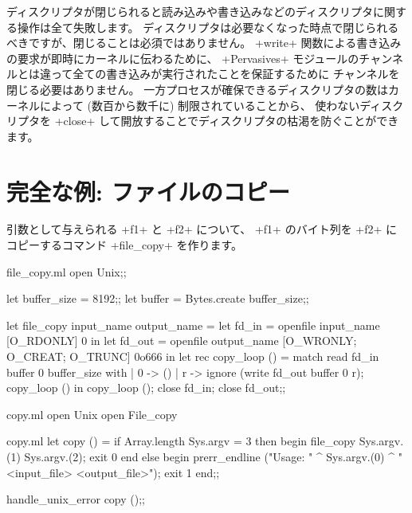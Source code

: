 ディスクリプタが閉じられると読み込みや書き込みなどのディスクリプタに関する操作は全て失敗します。
ディスクリプタは必要なくなった時点で閉じられるべきですが、閉じることは必須ではありません。
\ml+write+ 関数による書き込みの要求が即時にカーネルに伝わるために、
\ml+Pervasives+ モジュールのチャンネルとは違って全ての書き込みが実行されたことを保証するために
チャンネルを閉じる必要はありません。
一方プロセスが確保できるディスクリプタの数はカーネルによって (数百から数千に) 制限されていることから、
使わないディスクリプタを \ml+close+ して開放することでディスクリプタの枯渇を防ぐことができます。

\section{\label{ex/filecopy}完全な例: ファイルのコピー}

引数として与えられる \ml+f1+ と \ml+f2+ について、
\ml+f1+ のバイト列を \ml+f2+ にコピーするコマンド \ml+file_copy+ を作ります。
%
\begin{listingcodefile}{file_copy.ml}
open Unix;;

let buffer_size = 8192;;
let buffer = Bytes.create buffer_size;;

let file_copy input_name output_name =
  let fd_in = openfile input_name [O_RDONLY] 0 in
  let fd_out = openfile output_name [O_WRONLY; O_CREAT; O_TRUNC] 0o666 in
  let rec copy_loop () = match read fd_in buffer 0 buffer_size with
    |  0 -> ()
    | r -> ignore (write fd_out buffer 0 r); copy_loop ()
  in
  copy_loop ();
  close fd_in;
  close fd_out;;
\end{listingcodefile}
%
\begin{codefile}{copy.ml}
open Unix
open File_copy
\end{codefile}
%
\begin{listingcodefile}{copy.ml}
let copy () =
  if Array.length Sys.argv = 3 then begin
    file_copy Sys.argv.(1) Sys.argv.(2);
    exit 0
  end else begin
    prerr_endline
      ("Usage: " ^ Sys.argv.(0) ^ " <input_file> <output_file>");
    exit 1
  end;;

handle_unix_error copy ();;
\end{listingcodefile}
%

